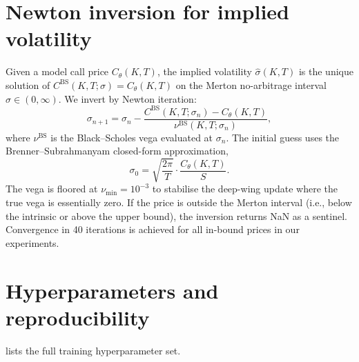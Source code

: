 \documentclass[largeformat]{interact}
\theoremstyle{plain}
\theoremstyle{definition}
\newcommand{\bs}{Black--Scholes}
\begin{document}
\section{Newton inversion for implied volatility}
\label{app:newton}

Given a model call price $C_\theta(K, T)$, the implied volatility $\widehat\sigma(K, T)$ is the unique solution of $C^{\mathrm{BS}}(K, T; \sigma) = C_\theta(K, T)$ on the Merton no-arbitrage interval $\sigma \in (0, \infty)$. We invert by Newton iteration:
\[
\sigma_{n+1} = \sigma_n - \frac{C^{\mathrm{BS}}(K, T; \sigma_n) - C_\theta(K, T)}{\nu^{\mathrm{BS}}(K, T; \sigma_n)},
\]
where $\nu^{\mathrm{BS}}$ is the \bs{} vega evaluated at $\sigma_n$. The initial guess uses the Brenner--Subrahmanyam closed-form approximation,
\[
\sigma_0 = \sqrt{\frac{2\pi}{T}} \cdot \frac{C_\theta(K, T)}{S}.
\]
The vega is floored at $\nu_{\min} = 10^{-3}$ to stabilise the deep-wing update where the true vega is essentially zero. If the price is outside the Merton interval (i.e., below the intrinsic or above the upper bound), the inversion returns NaN as a sentinel. Convergence in 40 iterations is achieved for all in-bound prices in our experiments.

\section{Hyperparameters and reproducibility}
\label{app:hyperparams}

 lists the full training hyperparameter set.
\end{document}
